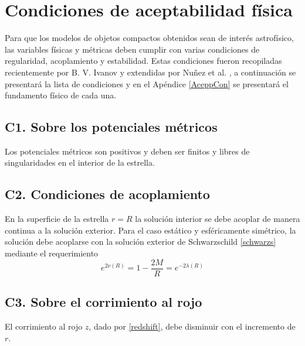 



\section{Condiciones de aceptabilidad física}\label{phyacep}
Para que los modelos de objetos compactos obtenidos sean de interés astrofísico, las variables físicas y métricas deben cumplir con varias condiciones de regularidad, acoplamiento y estabilidad. Estas condiciones fueron recopiladas recientemente por B. V. Ivanov \cite{Ivanov2017} y extendidas por Nuñez et al. \cite{Hernandez2018}, a continuación se presentará la lista de condiciones y en el Apéndice \ref{AceppCon} se presentará el fundamento físico de cada una.

\subsection*{C1. Sobre los potenciales métricos}
Los potenciales métricos son positivos y deben ser finitos y libres de singularidades en el interior de la estrella. 

\subsection*{C2. Condiciones de acoplamiento}
En la superficie de la estrella $r=R$ la solución interior se debe acoplar de manera continua a la solución exterior. Para el caso estático y esféricamente simétrico, la solución debe acoplarse con la solución exterior de Schwarzschild \eqref{schwarzs} mediante el requerimiento
\begin{equation}
      e ^ {  2 \nu(R) } =  1 - \frac { 2 M } { R } = e ^ { -2 \lambda(R) } 
\end{equation}

\subsection*{C3. Sobre el corrimiento al rojo}
El corrimiento al rojo $z$, dado por \eqref{redshift}, debe disminuir con el incremento de $r$.

